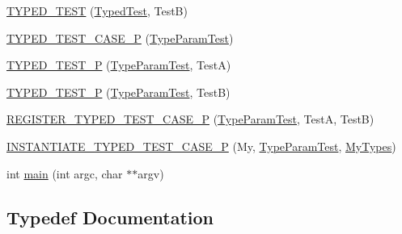 \begin{DoxyCompactItemize}
\item 
\mbox{\hyperlink{_obj__test_2lib_2googletest-release-1_88_81_2googletest_2test_2googletest-list-tests-unittest___8cc_a1ac7e35f3d659458b18cc29d71ed1f46}{T\+Y\+P\+E\+D\+\_\+\+T\+E\+ST}} (\mbox{\hyperlink{class_typed_test}{Typed\+Test}}, TestB)
\item 
\mbox{\hyperlink{_obj__test_2lib_2googletest-release-1_88_81_2googletest_2test_2googletest-list-tests-unittest___8cc_a8f36af28829ba875ca3675b4054f48b6}{T\+Y\+P\+E\+D\+\_\+\+T\+E\+S\+T\+\_\+\+C\+A\+S\+E\+\_\+P}} (\mbox{\hyperlink{class_type_param_test}{Type\+Param\+Test}})
\item 
\mbox{\hyperlink{_obj__test_2lib_2googletest-release-1_88_81_2googletest_2test_2googletest-list-tests-unittest___8cc_aadd51dfff9d63b5e0faa0130697684c1}{T\+Y\+P\+E\+D\+\_\+\+T\+E\+S\+T\+\_\+P}} (\mbox{\hyperlink{class_type_param_test}{Type\+Param\+Test}}, TestA)
\item 
\mbox{\hyperlink{_obj__test_2lib_2googletest-release-1_88_81_2googletest_2test_2googletest-list-tests-unittest___8cc_a667494b5b0e4418064679f58c546db97}{T\+Y\+P\+E\+D\+\_\+\+T\+E\+S\+T\+\_\+P}} (\mbox{\hyperlink{class_type_param_test}{Type\+Param\+Test}}, TestB)
\item 
\mbox{\hyperlink{_obj__test_2lib_2googletest-release-1_88_81_2googletest_2test_2googletest-list-tests-unittest___8cc_a3316a9dc1c581f96a50ec10e0c116e5c}{R\+E\+G\+I\+S\+T\+E\+R\+\_\+\+T\+Y\+P\+E\+D\+\_\+\+T\+E\+S\+T\+\_\+\+C\+A\+S\+E\+\_\+P}} (\mbox{\hyperlink{class_type_param_test}{Type\+Param\+Test}}, TestA, TestB)
\item 
\mbox{\hyperlink{_obj__test_2lib_2googletest-release-1_88_81_2googletest_2test_2googletest-list-tests-unittest___8cc_abace4e22d147fb69e2be527b355a2316}{I\+N\+S\+T\+A\+N\+T\+I\+A\+T\+E\+\_\+\+T\+Y\+P\+E\+D\+\_\+\+T\+E\+S\+T\+\_\+\+C\+A\+S\+E\+\_\+P}} (My, \mbox{\hyperlink{class_type_param_test}{Type\+Param\+Test}}, \mbox{\hyperlink{googletest-master_2googletest_2test_2googletest-list-tests-unittest___8cc_a16f58cd49c18568802322bbaf9f3f654}{My\+Types}})
\item 
int \mbox{\hyperlink{_obj__test_2lib_2googletest-release-1_88_81_2googletest_2test_2googletest-list-tests-unittest___8cc_a3c04138a5bfe5d72780bb7e82a18e627}{main}} (int argc, char $\ast$$\ast$argv)
\end{DoxyCompactItemize}


\subsection{Typedef Documentation}
\mbox{\label{_obj__test_2lib_2googletest-release-1_88_81_2googletest_2test_2googletest-list-tests-unittest___8cc_a16f58cd49c18568802322bbaf9f3f654}} 
